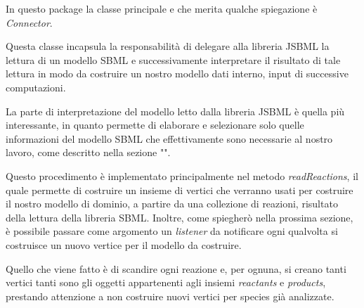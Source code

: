 In questo package la classe principale e che merita qualche
spiegazione \`e \emph{Connector}.

Questa classe incapsula la responsabilit\`a di delegare alla libreria
JSBML la lettura di un modello SBML e successivamente interpretare il
risultato di tale lettura in modo da costruire un nostro modello dati
interno, input di successive computazioni.

La parte di interpretazione del modello letto dalla libreria JSBML \`e
quella pi\`u interessante, in quanto permette di elaborare e
selezionare solo quelle informazioni del modello SBML che
effettivamente sono necessarie al nostro lavoro, come descritto nella
sezione "". 

Questo procedimento \`e implementato principalmente nel metodo
\emph{readReactions}, il quale permette di costruire un insieme di
vertici che verranno usati per costruire il nostro modello di dominio,
a partire da una collezione di reazioni, risultato della lettura della
libreria SBML. Inoltre, come spiegher\`o nella prossima sezione, \`e
possibile passare come argomento un \emph{listener} da notificare ogni
qualvolta si costruisce un nuovo vertice per il modello da costruire.

Quello che viene fatto \`e di scandire ogni reazione e, per ognuna, si
creano tanti vertici tanti sono gli oggetti appartenenti agli insiemi
\emph{reactants} e \emph{products}, prestando attenzione a non
costruire nuovi vertici per species gi\`a analizzate.
